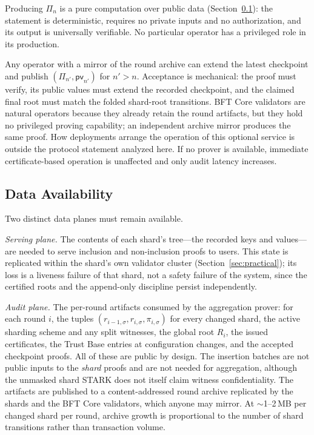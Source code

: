 \documentclass[twocolumn]{article}
\begin{document}
Producing $\Pi_n$ is a pure computation over public data (Section~\ref{sec:data-availability}): the statement is deterministic, requires no private inputs and no authorization, and its output is universally verifiable. No particular operator has a privileged role in its production.

Any operator with a mirror of the round archive can extend the latest checkpoint and publish $(\Pi_{n'},\mathsf{pv}_{n'})$ for $n'>n$. Acceptance is mechanical: the proof must verify, its public values must extend the recorded checkpoint, and the claimed final root must match the folded shard-root transitions. BFT Core validators are natural operators because they already retain the round artifacts, but they hold no privileged proving capability; an independent archive mirror produces the same proof. How deployments arrange the operation of this optional service is outside the protocol statement analyzed here. If no prover is available, immediate certificate-based operation is unaffected and only audit latency increases.

\subsection{Data Availability}
\label{sec:data-availability}

Two distinct data planes must remain available.

\emph{Serving plane.} The contents of each shard's tree---the recorded keys and values---are needed to serve inclusion and non-inclusion proofs to users. This state is replicated within the shard's own validator cluster (Section~\ref{sec:practical}); its loss is a liveness failure of that shard, not a safety failure of the system, since the certified roots and the append-only discipline persist independently.

\emph{Audit plane.} The per-round artifacts consumed by the aggregation prover: for each round $i$, the tuples $(r_{i-1,\sigma}, r_{i,\sigma}, \pi_{i,\sigma})$ for every changed shard, the active sharding scheme and any split witnesses, the global root $R_i$, the issued certificates, the Trust Base entries at configuration changes, and the accepted checkpoint proofs. All of these are public by design. The insertion batches are not public inputs to the \emph{shard} proofs and are not needed for aggregation, although the unmasked shard STARK does not itself claim witness confidentiality. The artifacts are published to a content-addressed round archive replicated by the shards and the BFT Core validators, which anyone may mirror. At $\sim$1--2\,MB per changed shard per round, archive growth is proportional to the number of shard transitions rather than transaction volume.
\end{document}
